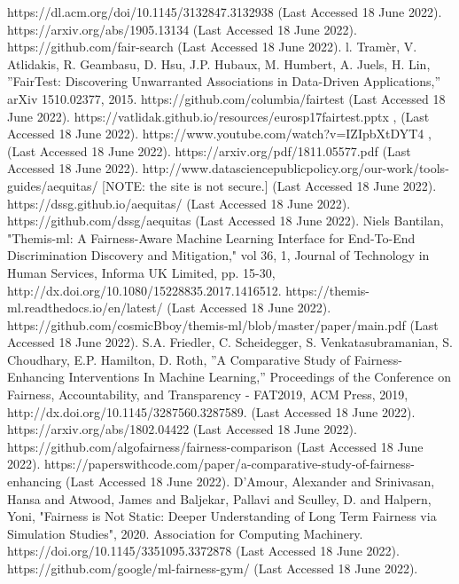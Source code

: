 \documentclass[conference]{IEEEtran}
\begin{document}
\begin{thebibliography}{00}
 https://dl.acm.org/doi/10.1145/3132847.3132938 (Last Accessed 18 June 2022).
 https://arxiv.org/abs/1905.13134 (Last Accessed 18 June 2022).
 https://github.com/fair-search (Last Accessed 18 June 2022).
 l. Tramèr, V. Atlidakis, R. Geambasu, D. Hsu, J.P. Hubaux, M. Humbert, A. Juels, H. Lin, ''FairTest: Discovering Unwarranted Associations in Data-Driven Applications,'' arXiv 1510.02377, 2015.
 https://github.com/columbia/fairtest (Last Accessed 18 June 2022).
 https://vatlidak.github.io/resources/eurosp17fairtest.pptx , (Last Accessed 18 June 2022).
 https://www.youtube.com/watch?v=IZIpbXtDYT4 , (Last Accessed 18 June 2022).
 https://arxiv.org/pdf/1811.05577.pdf (Last Accessed 18 June 2022).
 http://www.datasciencepublicpolicy.org/our-work/tools-guides/aequitas/ [NOTE: the site is not secure.] (Last Accessed 18 June 2022).
 https://dssg.github.io/aequitas/ (Last Accessed 18 June 2022).
 https://github.com/dssg/aequitas (Last Accessed 18 June 2022).
 Niels Bantilan, "Themis-ml: A Fairness-Aware Machine Learning Interface for End-To-End Discrimination Discovery and Mitigation," vol 36, 1, Journal of Technology in Human Services, Informa UK Limited, pp. 15-30, http://dx.doi.org/10.1080/15228835.2017.1416512.
 https://themis-ml.readthedocs.io/en/latest/ (Last Accessed 18 June 2022).
 https://github.com/cosmicBboy/themis-ml/blob/master/paper/main.pdf (Last Accessed 18 June 2022).
 S.A. Friedler, C. Scheidegger, S. Venkatasubramanian, S. Choudhary, E.P. Hamilton, D. Roth, ''A Comparative Study of Fairness-Enhancing Interventions In Machine Learning,'' Proceedings of the Conference on Fairness, Accountability, and Transparency - FAT2019, ACM Press, 2019, http://dx.doi.org/10.1145/3287560.3287589. (Last Accessed 18 June 2022).
 https://arxiv.org/abs/1802.04422 (Last Accessed 18 June 2022).
 https://github.com/algofairness/fairness-comparison (Last Accessed 18 June 2022).
 https://paperswithcode.com/paper/a-comparative-study-of-fairness-enhancing (Last Accessed 18 June 2022).
 D'Amour, Alexander and Srinivasan, Hansa and Atwood, James and Baljekar, Pallavi and Sculley, D. and Halpern, Yoni, "Fairness is Not Static: Deeper Understanding of Long Term Fairness via Simulation Studies", 2020. Association for Computing Machinery.
 https://doi.org/10.1145/3351095.3372878 (Last Accessed 18 June 2022).
 https://github.com/google/ml-fairness-gym/ (Last Accessed 18 June 2022).

\end{thebibliography}
\end{document}
